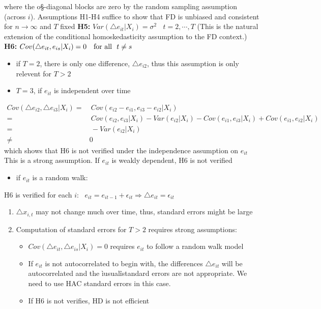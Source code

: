 \documentclass[a4paper,twoside,11pt]{article}
\begin{document}
where the o§-diagonal blocks are zero by the random sampling assumption (across $i$).
\newline
\newline
\textcolor{NavyBlue}{Assumptions H1-H4 suffice to show that FD is unbiased and consistent for $n \rightarrow \infty$ and $T$ fixed}
\newline
\newline
\textbf{H5:} $Var(\bigtriangleup e_{it} | X_i ) = \sigma^2 \ \ \ \ t=2,\cdots, T$ (This is the natural extension of the conditional homoskedasticity
assumption to the FD context.)
\newline
\textbf{H6:} $Cov(\bigtriangleup e_{it}, e_{is} | X_i ) =0 \ \ \ \textmd{for all} \ \ t \ne s$
\begin{itemize}
    \item if $T=2$, there is only one difference, $\bigtriangleup e_{i2}$, thus this assumption is only relevent for $T>2$ 
    \item $T=3$, if $e_{it}$ is independent over time
\end{itemize}
\begin{equation*}
\begin{aligned}
Cov(\bigtriangleup e_{i2}, \bigtriangleup e_{i3} | X_i ) =& \ Cov(e_{i2} - e_{i1}, e_{i3} - e_{i2} | X_i) \\
=& \ Cov(e_{i2}, e_{i3} |X_i ) - Var(e_{i2} | X_i ) - Cov(e_{i1}, e_{i3}|X_i)+ Cov(e_{i1} , e_{i2} | X_i ) \\
=& \ - Var(e_{i2} | X_i) \\
\ne & 0 
\end{aligned}
\end{equation*}
which shows that H6 is not verified under the independence assumption on $e_{it}$
\newline
\textcolor{NavyBlue}{This is a strong assumption. If $e_{it}$ is weakly dependent, H6 is not verified}
\begin{itemize}
    \item if $e_{it}$ is a random walk:
\end{itemize}
H6 is verified for each $i: \ \ \ e_{it} = e_{it-1} + \epsilon_{it} \Rightarrow \bigtriangleup e_{it} = \epsilon_{it}$
\begin{enumerate}
    \item $\bigtriangleup x_{i,t}$ may not change much over time, thus, standard errors might be large
    \item Computation of standard errors for $T>2$ requires strong assumptions:
    \begin{itemize}
        \item $Cov(\bigtriangleup e_{it}, \bigtriangleup e_{is} | X_i) =0$ requires $e_{it}$ to follow a random walk model
        \item If $e_{it}$ is not autocorrelated to begin with, the differences $\bigtriangleup e_{it}$ will be autocorrelated and the ìusualîstandard errors are not appropriate. We need to use HAC standard errors in this case.
        \item If H6 is not verifies, HD is not efficient
    \end{itemize}
\end{enumerate}
\end{document}
